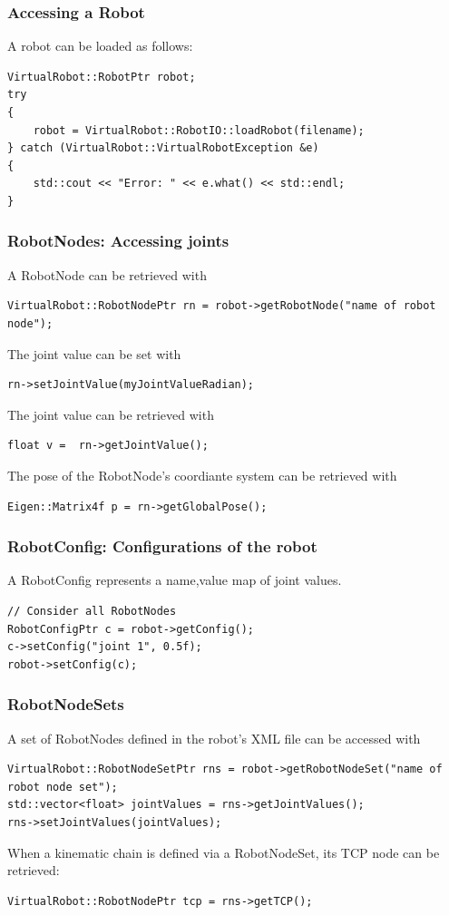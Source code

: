 \subsubsection{Accessing a Robot}
A robot can be loaded as follows:
\begin{lstlisting}
VirtualRobot::RobotPtr robot;
try
{
    robot = VirtualRobot::RobotIO::loadRobot(filename);
} catch (VirtualRobot::VirtualRobotException &e)
{
    std::cout << "Error: " << e.what() << std::endl;
}
\end{lstlisting}
\subsubsection*{RobotNodes: Accessing joints}
A RobotNode can be retrieved with
\begin{lstlisting}
VirtualRobot::RobotNodePtr rn = robot->getRobotNode("name of robot node");
\end{lstlisting}
The joint value can be set with 
\begin{lstlisting}
rn->setJointValue(myJointValueRadian);
\end{lstlisting}
The joint value can be retrieved with
\begin{lstlisting}
float v =  rn->getJointValue();
\end{lstlisting}
The pose of the RobotNode's coordiante system can be retrieved with
\begin{lstlisting}
Eigen::Matrix4f p = rn->getGlobalPose();
\end{lstlisting}
\subsubsection*{RobotConfig: Configurations of the robot}
A RobotConfig represents a name,value map of joint values.
\begin{lstlisting}
// Consider all RobotNodes
RobotConfigPtr c = robot->getConfig();
c->setConfig("joint 1", 0.5f);
robot->setConfig(c);
\end{lstlisting}
\subsubsection*{RobotNodeSets}
A set of RobotNodes defined in the robot's XML file can be accessed with
\begin{lstlisting}
VirtualRobot::RobotNodeSetPtr rns = robot->getRobotNodeSet("name of robot node set");
std::vector<float> jointValues = rns->getJointValues();
rns->setJointValues(jointValues);
\end{lstlisting}
When a kinematic chain is defined via a RobotNodeSet, its TCP node can be retrieved: 
\begin{lstlisting}
VirtualRobot::RobotNodePtr tcp = rns->getTCP();
\end{lstlisting}
